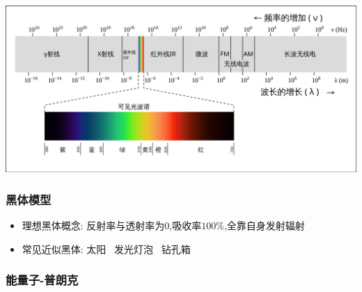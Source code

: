 \documentclass{article}
\begin{document}
\includegraphics[width=37em,keepaspectratio]{./pictures/6.png}

\vspace{2em}

\subsubsection{黑体模型}
\begin{itemize}
    \item 理想黑体概念: 反射率与透射率为$0$,吸收率$100\%$,全靠自身发射辐射
    \item 常见近似黑体: 太阳 \, 发光灯泡 \, 钻孔箱
\end{itemize}

\vspace{2em}

\subsubsection{能量子-普朗克}
\end{document}
